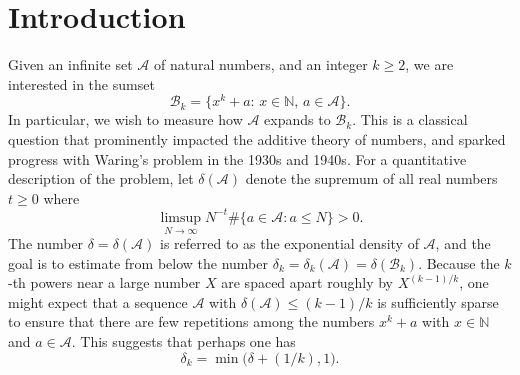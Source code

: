 \documentclass[reqno]{amsart}
\numberwithin{equation}{section}
\begin{document}
\maketitle


\section{Introduction}
Given an infinite set $\mathscr A$ of natural numbers, and an integer $k\ge 2$, we are interested in the sumset
\begin{equation}\label{11} \mathscr B_k =\{x^k+a: \, x\in\mathbb N,\, a\in\mathscr A\}. 
\end{equation}
In particular, we wish to measure how $\mathscr A$ expands to $\mathscr B_k$. This is a classical question that prominently impacted the additive theory of numbers, and sparked progress with Waring's problem in the 1930s and 1940s. For a quantitative description of the problem,
let $\delta(\mathscr A)$ denote the supremum of all real numbers $t\ge 0$ where
$$  
\limsup_{N\to\infty} N^{-t} \# \{a\in\mathscr A: a\le N\} >0. 
$$
The number $\delta=\delta(\mathscr A)$ is referred to as the exponential density of $\mathscr A$, and the goal is to estimate from below the number
$\delta_k= \delta_k(\mathscr A) = \delta(\mathscr B_k)$. 
Because the $k$-th powers near a large number $X$ are spaced apart roughly by $X^{(k-1)/k}$, one might expect that a sequence $\mathscr A$ with $ \delta(\mathscr A)\le (k-1)/k$ is sufficiently sparse to ensure that there are few repetitions among the numbers $x^k+a$ with $x\in\mathbb N$ and $a\in\mathscr A$. This suggests that perhaps one has
\begin{equation}\label{14} \delta_k = \min\big( \delta + (1/k) , 1\big). \end{equation}
 
\end{document}
